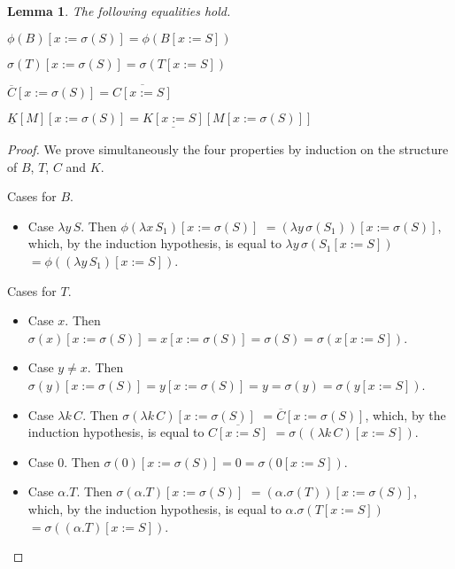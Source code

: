 \documentclass{LMCS}
\newtheorem{lemma}[theorem]{Lemma}
\begin{document}
\begin{lemma}
  \label{lem:substitution-lemma-a} The following equalities hold.
  \begin{myenumerate}
    \item {$\phi(B)[x:=\sigma(S)]=\phi(B[x:=S])$}
    \item $\sigma(T)[x:=\sigma(S)]=\sigma(T[x:=S])$
    \item {$\overline{C}[x:=\sigma(S)]=\overline{C[x:=S]}$}
    \item $\underline{K}[M][x:=\sigma(S)]=\underline{K[x:=S]}[M[x:=\sigma(S)]]$
  \end{myenumerate}
\end{lemma}
\begin{proof}
  We prove simultaneously the four properties by induction on the structure of $B$, $T$, $C$ and $K$.
  \begin{myenumerate}
    \item Cases for $B$.
      \begin{itemize}
	\item Case $\lambda y\,S$. Then 
	  $\phi(\lambda x\,S_{1})[x:=\sigma(S)]$
	  $=(\lambda y\,\sigma(S_{1}))[x:=\sigma(S)]$,
	  which, by the induction hypothesis, is equal to
	  $\lambda y\,\sigma(S_{1}[x:=S])$
	  $=\phi((\lambda y\,S_{1})[x:=S])$.
      \end{itemize}
    \item Cases for $T$.
      \begin{itemize}
	\item Case $x$. Then $\sigma(x)[x:=\sigma(S)]=x[x:=\sigma(S)]=\sigma(S)=\sigma(x[x:=S])$.
	\item Case $y\neq x$. Then $\sigma(y)[x:=\sigma(S)]=y[x:=\sigma(S)]=y=\sigma(y)=\sigma(y[x:=S])$.
	\item Case $\lambda k\,C$. Then 
	  $\sigma(\lambda k\,C)[x:=\sigma(S)]$
	  $=\overline{C}[x:=\sigma(S)]$,
	  which, by the induction hypothesis, is equal to
	  $\overline{C[x:=S]}$
	  $=\sigma((\lambda k\,C)[x:=S])$.

	\item Case $0$. Then $\sigma(0)[x:=\sigma(S)]=0=\sigma(0[x:=S])$.
	\item Case $\alpha.T$. Then 
	  $\sigma(\alpha.T)[x:=\sigma(S)]$
	  $=(\alpha.\sigma(T))[x:=\sigma(S)]$,
	  which, by the induction hypothesis, is equal to
	  $\alpha.\sigma(T[x:=S])$
	  $=\sigma((\alpha.T)[x:=S])$.


\end{itemize}
\end{myenumerate}
\end{proof}
\end{document}
